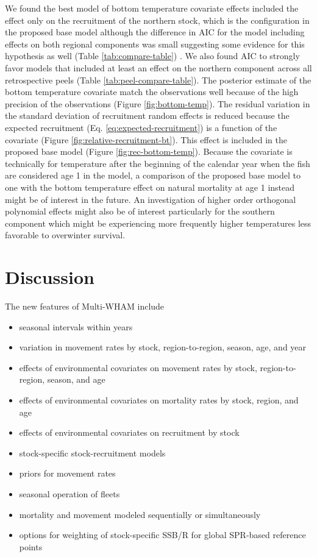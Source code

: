 \documentclass[
]{article}
\providecommand{\tightlist}{%
  \setlength{\itemsep}{0pt}\setlength{\parskip}{0pt}}
\begin{document}
We found the best model of bottom temperature covariate effects included
the effect only on the recruitment of the northern stock, which is the
configuration in the proposed base model although the difference in AIC
for the model including effects on both regional components was small
suggesting some evidence for this hypothesis as well (Table
\ref{tab:compare-table}) . We also found AIC to strongly favor models
that included at least an effect on the northern component across all
retrospective peels (Table \ref{tab:peel-compare-table}). The posterior
estimate of the bottom temperature covariate match the observations well
because of the high precision of the observations (Figure
\ref{fig:bottom-temp}). The residual variation in the standard deviation
of recruitment random effects is reduced because the expected
recruitment (Eq. \ref{eq:expected-recruitment}) is a function of the
covariate (Figure \ref{fig:relative-recruitment-bt}). This effect is
included in the proposed base model (Figure \ref{fig:rec-bottom-temp}).
Because the covariate is technically for temperature after the beginning
of the calendar year when the fish are considered age 1 in the model, a
comparison of the proposed base model to one with the bottom temperature
effect on natural mortality at age 1 instead might be of interest in the
future. An investigation of higher order orthogonal polynomial effects
might also be of interest particularly for the southern component which
might be experiencing more frequently higher temperatures less favorable
to overwinter survival.

\hypertarget{discussion}{%
\section*{Discussion}\label{discussion}}

The new features of Multi-WHAM include

\begin{itemize}
\tightlist
\item
  seasonal intervals within years
\item
  variation in movement rates by stock, region-to-region, season, age,
  and year
\item
  effects of environmental covariates on movement rates by stock,
  region-to-region, season, and age
\item
  effects of environmental covariates on mortality rates by stock,
  region, and age
\item
  effects of environmental covariates on recruitment by stock
\item
  stock-specific stock-recruitment models
\item
  priors for movement rates
\item
  seasonal operation of fleets
\item
  mortality and movement modeled sequentially or simultaneously
\item
  options for weighting of stock-specific SSB/R for global SPR-based
  reference points
\end{itemize}
\end{document}
